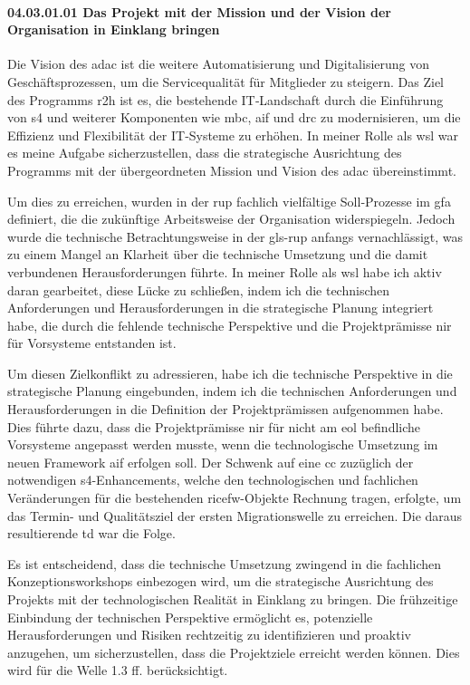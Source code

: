\paragraph*{04.03.01.01 Das Projekt mit der Mission und der Vision der Organisation in Einklang bringen}

\par Die Vision des \gls{adac} ist die weitere Automatisierung und Digitalisierung von Geschäftsprozessen, um die Servicequalität für Mitglieder zu steigern. Das Ziel des Programms \gls{r2h} ist es, die bestehende IT‑Landschaft durch die Einführung von \gls{s4} und weiterer Komponenten wie \gls{mbc}, \gls{aif} und \gls{drc} zu modernisieren, um die Effizienz und Flexibilität der IT‑Systeme zu erhöhen. In meiner Rolle als \gls{wsl} war es meine Aufgabe sicherzustellen, dass die strategische Ausrichtung des Programms mit der übergeordneten Mission und Vision des \gls{adac} übereinstimmt.

\par Um dies zu erreichen, wurden in der \gls{rup} fachlich vielfältige Soll‑Prozesse im \gls{gfa} definiert, die die zukünftige Arbeitsweise der Organisation widerspiegeln. Jedoch wurde die technische Betrachtungsweise in der \gls{gls-rup} anfangs vernachlässigt, was zu einem Mangel an Klarheit über die technische Umsetzung und die damit verbundenen Herausforderungen führte. In meiner Rolle als \gls{wsl} habe ich aktiv daran gearbeitet, diese Lücke zu schließen, indem ich die technischen Anforderungen und Herausforderungen in die strategische Planung integriert habe, die durch die fehlende technische Perspektive und die Projektprämisse \gls{nir} für Vorsysteme entstanden ist.

\par Um diesen Zielkonflikt zu adressieren, habe ich die technische Perspektive in die strategische Planung eingebunden, indem ich die technischen Anforderungen und Herausforderungen in die Definition der Projektprämissen aufgenommen habe. Dies führte dazu, dass die Projektprämisse \gls{nir} für nicht am \gls{eol} befindliche Vorsysteme angepasst werden musste, wenn die technologische Umsetzung im neuen Framework \gls{aif} erfolgen soll. Der Schwenk auf eine \gls{cc} zuzüglich der notwendigen \gls{s4}-Enhancements, welche den technologischen und fachlichen Veränderungen für die bestehenden \gls{ricefw}-Objekte Rechnung tragen, erfolgte, um das Termin- und Qualitätsziel der ersten Migrationswelle zu erreichen. Die daraus resultierende \gls{td} war die Folge.

\par Es ist entscheidend, dass die technische Umsetzung zwingend in die fachlichen Konzeptionsworkshops einbezogen wird, um die strategische Ausrichtung des Projekts mit der technologischen Realität in Einklang zu bringen. Die frühzeitige Einbindung der technischen Perspektive ermöglicht es, potenzielle Herausforderungen und Risiken rechtzeitig zu identifizieren und proaktiv anzugehen, um sicherzustellen, dass die Projektziele erreicht werden können. Dies wird für die Welle 1.3 ff. berücksichtigt.
